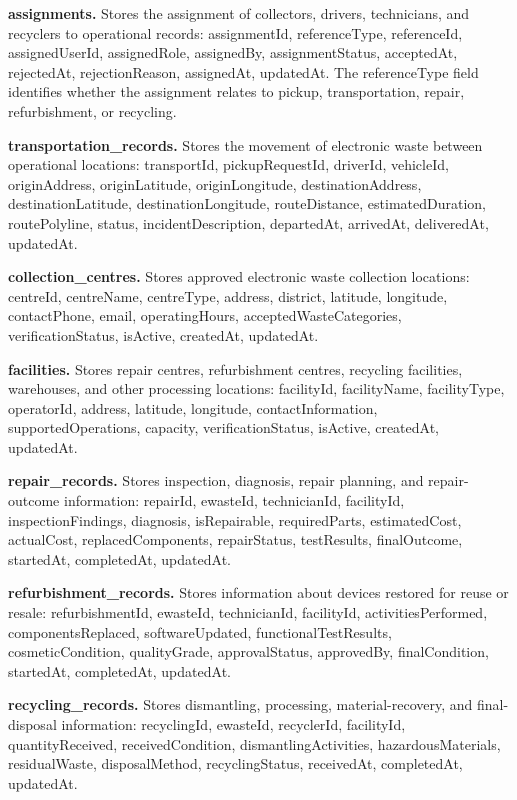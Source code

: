 \textbf{assignments.} Stores the assignment of collectors, drivers,
technicians, and recyclers to operational records: assignmentId,
referenceType, referenceId, assignedUserId, assignedRole, assignedBy,
assignmentStatus, acceptedAt, rejectedAt, rejectionReason, assignedAt,
updatedAt. The referenceType field identifies whether the assignment relates
to pickup, transportation, repair, refurbishment, or recycling.

\textbf{transportation\_records.} Stores the movement of electronic waste
between operational locations: transportId, pickupRequestId, driverId,
vehicleId, originAddress, originLatitude, originLongitude, destinationAddress,
destinationLatitude, destinationLongitude, routeDistance, estimatedDuration,
routePolyline, status, incidentDescription, departedAt, arrivedAt, deliveredAt,
updatedAt.

\textbf{collection\_centres.} Stores approved electronic waste collection
locations: centreId, centreName, centreType, address, district, latitude,
longitude, contactPhone, email, operatingHours, acceptedWasteCategories,
verificationStatus, isActive, createdAt, updatedAt.

\textbf{facilities.} Stores repair centres, refurbishment centres, recycling
facilities, warehouses, and other processing locations: facilityId,
facilityName, facilityType, operatorId, address, latitude, longitude,
contactInformation, supportedOperations, capacity, verificationStatus,
isActive, createdAt, updatedAt.

\textbf{repair\_records.} Stores inspection, diagnosis, repair planning, and
repair-outcome information: repairId, ewasteId, technicianId, facilityId,
inspectionFindings, diagnosis, isRepairable, requiredParts, estimatedCost,
actualCost, replacedComponents, repairStatus, testResults, finalOutcome,
startedAt, completedAt, updatedAt.

\textbf{refurbishment\_records.} Stores information about devices restored
for reuse or resale: refurbishmentId, ewasteId, technicianId, facilityId,
activitiesPerformed, componentsReplaced, softwareUpdated,
functionalTestResults, cosmeticCondition, qualityGrade, approvalStatus,
approvedBy, finalCondition, startedAt, completedAt, updatedAt.

\textbf{recycling\_records.} Stores dismantling, processing,
material-recovery, and final-disposal information: recyclingId, ewasteId,
recyclerId, facilityId, quantityReceived, receivedCondition,
dismantlingActivities, hazardousMaterials, residualWaste, disposalMethod,
recyclingStatus, receivedAt, completedAt, updatedAt.

